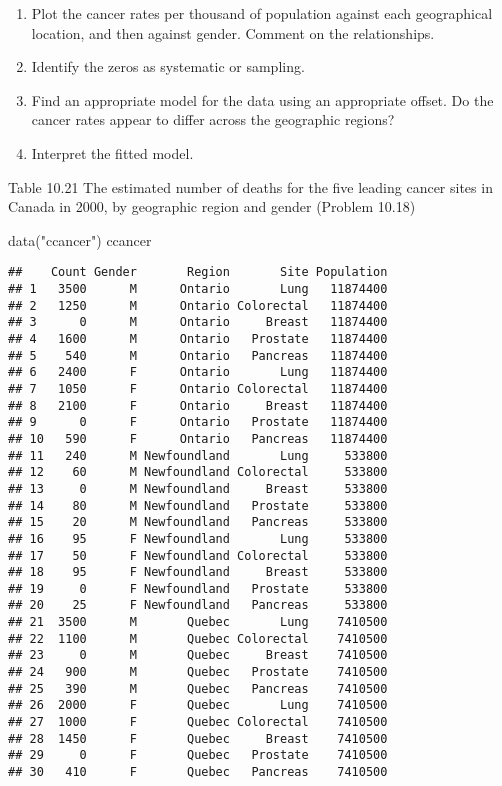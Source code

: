 \documentclass[
]{article}
\newenvironment{Shaded}{\begin{snugshade}}{\end{snugshade}}
\newcommand{\FunctionTok}[1]{\textcolor[rgb]{0.00,0.00,0.00}{#1}}
\newcommand{\NormalTok}[1]{#1}
\newcommand{\StringTok}[1]{\textcolor[rgb]{0.31,0.60,0.02}{#1}}
\providecommand{\tightlist}{%
  \setlength{\itemsep}{0pt}\setlength{\parskip}{0pt}}
\begin{document}
\begin{enumerate}
\def\labelenumi{\arabic{enumi}.}
\tightlist
\item
  Plot the cancer rates per thousand of population against each
  geographical location, and then against gender. Comment on the
  relationships.
\item
  Identify the zeros as systematic or sampling.
\item
  Find an appropriate model for the data using an appropriate oﬀset. Do
  the cancer rates appear to diﬀer across the geographic regions?
\item
  Interpret the ﬁtted model.
\end{enumerate}

Table 10.21 The estimated number of deaths for the ﬁve leading cancer
sites in Canada in 2000, by geographic region and gender (Problem 10.18)

\begin{Shaded}
\begin{Highlighting}[]
\FunctionTok{data}\NormalTok{(}\StringTok{"ccancer"}\NormalTok{)}
\NormalTok{ccancer}
\end{Highlighting}
\end{Shaded}

\begin{verbatim}
##    Count Gender       Region       Site Population
## 1   3500      M      Ontario       Lung   11874400
## 2   1250      M      Ontario Colorectal   11874400
## 3      0      M      Ontario     Breast   11874400
## 4   1600      M      Ontario   Prostate   11874400
## 5    540      M      Ontario   Pancreas   11874400
## 6   2400      F      Ontario       Lung   11874400
## 7   1050      F      Ontario Colorectal   11874400
## 8   2100      F      Ontario     Breast   11874400
## 9      0      F      Ontario   Prostate   11874400
## 10   590      F      Ontario   Pancreas   11874400
## 11   240      M Newfoundland       Lung     533800
## 12    60      M Newfoundland Colorectal     533800
## 13     0      M Newfoundland     Breast     533800
## 14    80      M Newfoundland   Prostate     533800
## 15    20      M Newfoundland   Pancreas     533800
## 16    95      F Newfoundland       Lung     533800
## 17    50      F Newfoundland Colorectal     533800
## 18    95      F Newfoundland     Breast     533800
## 19     0      F Newfoundland   Prostate     533800
## 20    25      F Newfoundland   Pancreas     533800
## 21  3500      M       Quebec       Lung    7410500
## 22  1100      M       Quebec Colorectal    7410500
## 23     0      M       Quebec     Breast    7410500
## 24   900      M       Quebec   Prostate    7410500
## 25   390      M       Quebec   Pancreas    7410500
## 26  2000      F       Quebec       Lung    7410500
## 27  1000      F       Quebec Colorectal    7410500
## 28  1450      F       Quebec     Breast    7410500
## 29     0      F       Quebec   Prostate    7410500
## 30   410      F       Quebec   Pancreas    7410500
\end{verbatim}
\end{document}
